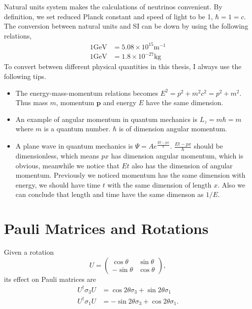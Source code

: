 Natural units system makes the calculations of neutrinos convenient. By definition, we set reduced Planck constant and speed of light to be 1, $\hbar = 1 = c$.
The conversion between natural units and SI can be down by using the following relations,
\begin{align}
   1 \mathrm{GeV} &= 5.08 \times 10^{15} \mathrm {m^{-1}} \\
   1 \mathrm{GeV} &= 1.8\times 10^{-27} \mathrm{kg}
\end{align}
To convert between different physical quantities in this thesis, I always use the following tips.
\begin{itemize}
    \item The energy-mass-momentum relations becomes $E^2 = p^2 + m^2c^2 = p^2 + m^2$. Thus mass $m$, momentum $\mathbf p$ and energy $E$ have the same dimension.
    \item An example of angular momentum in quantum mechanics is $L_z = m\hbar = m$ where $m$ is a quantum number. $\hbar$ is of dimension angular momentum.
    \item A plane wave in quantum mechanics is $\Psi = A e^{ \frac{E t - p x}{\hbar} }$. $\frac{E t - p x}{\hbar}$ should be dimensionless, which means $px$ has dimension angular momentum, which is obvious, meanwhile we notice that $E t$ also has the dimension of angular momentum. Previously we noticed momentum has the same dimension with energy, we should have time $t$ with the same dimension of length $x$. Also we can conclude that length and time have the same dimenson as $1/E$.
\end{itemize}



\section{Pauli Matrices and Rotations}


Given a rotation
\begin{equation}
   U = \begin{pmatrix} \cos \theta & \sin \theta \\ -\sin\theta & \cos \theta \end{pmatrix}, 
\end{equation}
its effect on Pauli matrices are
\begin{align}
      U^\dagger \sigma_3 U  &=\cos 2\theta \sigma_3 + \sin 2\theta \sigma_1 \\
  U^\dagger \sigma_1 U & = -\sin 2\theta \sigma_3 + \cos 2\theta \sigma_1.
\end{align}



